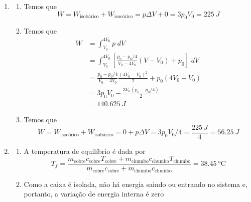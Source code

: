 \documentclass[12pt,a4paper,brazilian, fleqn]{article}
\begin{document}
\begin{enumerate}
    \item%
        \begin{enumerate}
            \item Temos que 
                \[
                    W = W_\text{isobárico}+W_\text{isocórico} = 
                    p\Delta V + 0 =
                    3p_0V_0 =
                    \SI{225}{J}
                \]
            \item Temos que 
                \[
                    \begin{split}
                        W &= \int_{V_0}^{4V_0} p\;dV \\
                          &=\int_{V_0}^{4V_0}\left[\frac{p_0 - p_0/4}{V_0 - 4V_0}(V-V_0)+p_0\right]\;dV \\
                          &=\frac{p_0 - p_0/4}{V_0 - 4V_0}\frac{(4V_0-V_0)^2}{2}+p_0(4V_0 - V_0) \\
                          &=3p_0 V_0 - \frac{3V_0(p_0 - p_0/4)}{2}\\
                          &= \SI{140.625}{J}
                    \end{split}
                \]
            \item Temos que 
                \[
                    W = W_\text{isocórico}+W_\text{isobárico} = 
                    0 + p\Delta V=
                    3p_0V_0/4 =
                    \frac{\SI{225}{J}}{4} = \SI{56.25}{J}
                \]
        \end{enumerate}
    \item%
        \begin{enumerate}
            \item A temperatura de equilíbrio é dada por
                \[
                    T_f = \frac{m_\text{cobre}c_\text{cobre}T_\text{cobre} + m_\text{chumbo}c_\text{chumbo}T_\text{chumbo}}
                               {m_\text{cobre}c_\text{cobre} + m_\text{chumbo}c_\text{chumbo}}=
                               \SI{38.45}{\celsius}
               \]
           \item Como a caixa é isolada, não há energia saindo ou entrando no sistema e, portanto, a
               variação de energia interna é zero


\end{enumerate}
\end{enumerate}
\end{document}
